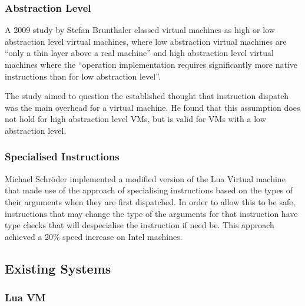 \documentclass[english,a4paper]{article}
\begin{document}
\subsubsection{Abstraction Level}

A 2009 study\cite{Brunthaler20093} by Stefan Brunthaler classed
virtual machines as high or low abstraction level virtual machines,
where low abstraction virtual machines are ``only a thin layer above a
real machine'' and high abstraction level virtual machines where the
``operation implementation requires significantly more native
instructions than for low abstraction level''.

The study aimed to question the established thought that instruction
dispatch was the main overhead for a virtual machine. He found that
this assumption does not hold for high abstraction level VMs, but is
valid for VMs with a low abstraction level.

\subsubsection{Specialised Instructions}

Michael Schr{\"o}der implemented a modified version of the Lua Virtual
machine that made use of the approach of specialising instructions
based on the types of their arguments when they are first
dispatched. In order to allow this to be safe, instructions that may
change the type of the arguments for that instruction have type checks
that will despecialise the instruction if need be. This approach
achieved a 20\% speed increase on Intel machines\cite{Schroder2012}.

\subsection{Existing Systems}

\subsubsection{Lua VM}
\end{document}
